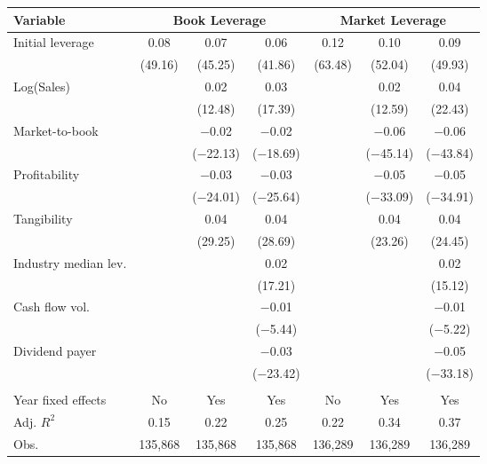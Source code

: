 \begin{tabular}{l*{6}{c}}
\toprule
Variable & \multicolumn{3}{c}{Book Leverage} & \multicolumn{3}{c}{Market Leverage} \\ \midrule
Initial leverage&        0.08&        0.07&        0.06&        0.12&        0.10&        0.09\\
            &     (49.16)&     (45.25)&     (41.86)&     (63.48)&     (52.04)&     (49.93)\\
\addlinespace
Log(Sales)  &            &        0.02&        0.03&            &        0.02&        0.04\\
            &            &     (12.48)&     (17.39)&            &     (12.59)&     (22.43)\\
\addlinespace
Market-to-book&            &     $-$0.02&     $-$0.02&            &     $-$0.06&     $-$0.06\\
            &            &  ($-$22.13)&  ($-$18.69)&            &  ($-$45.14)&  ($-$43.84)\\
\addlinespace
Profitability&            &     $-$0.03&     $-$0.03&            &     $-$0.05&     $-$0.05\\
            &            &  ($-$24.01)&  ($-$25.64)&            &  ($-$33.09)&  ($-$34.91)\\
\addlinespace
Tangibility &            &        0.04&        0.04&            &        0.04&        0.04\\
            &            &     (29.25)&     (28.69)&            &     (23.26)&     (24.45)\\
\addlinespace
Industry median lev.&            &            &        0.02&            &            &        0.02\\
            &            &            &     (17.21)&            &            &     (15.12)\\
\addlinespace
Cash flow vol.&            &            &     $-$0.01&            &            &     $-$0.01\\
            &            &            &   ($-$5.44)&            &            &   ($-$5.22)\\
\addlinespace
Dividend payer&            &            &     $-$0.03&            &            &     $-$0.05\\
            &            &            &  ($-$23.42)&            &            &  ($-$33.18)\\
\\
Year fixed effects&          No&         Yes&         Yes&          No&         Yes&         Yes\\
Adj. $ R^2$ &        0.15&        0.22&        0.25&        0.22&        0.34&        0.37\\
Obs.        &     135,868&     135,868&     135,868&     136,289&     136,289&     136,289\\
\bottomrule
\end{tabular}
